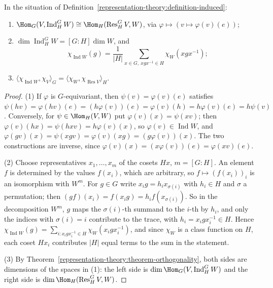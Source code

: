 \begin{proposition}\label{representation-theory:proposition-frobenius}
In the situation of Definition~\ref{representation-theory:definition-induced}:
\begin{enumerate}
\item $\Hom_G(V, \operatorname{Ind}_H^GW) \cong \Hom_H(\operatorname{Res}^G_HV, W)$, via $\varphi \mapsto (v \mapsto \varphi(v)(e))$;
\item $\dim\operatorname{Ind}_H^GW = [G : H]\dim W$, and
\[
\chi_{\operatorname{Ind}W}(g) = \frac{1}{|H|}\sum_{x \in G,\ xgx^{-1} \in H}\chi_W(xgx^{-1});
\]
\item $\langle\chi_{\operatorname{Ind}W}, \chi_V\rangle_G = \langle\chi_W, \chi_{\operatorname{Res}V}\rangle_H$.
\end{enumerate}
\end{proposition}

\begin{proof}
(1) If $\varphi$ is $G$-equivariant, then $\psi(v) = \varphi(v)(e)$ satisfies $\psi(hv) = \varphi(hv)(e) = (h\varphi(v))(e) = \varphi(v)(h) = h\varphi(v)(e) = h\psi(v)$. Conversely, for $\psi \in \Hom_H(V, W)$ put $\varphi(v)(x) = \psi(xv)$; then
$\varphi(v)(hx) = \psi(hxv) = h\varphi(v)(x)$, so $\varphi(v) \in \operatorname{Ind}W$, and $\varphi(gv)(x) = \psi(xgv) = \varphi(v)(xg) = (g\varphi(v))(x)$. The two constructions are inverse, since $\varphi(v)(x) = (x\varphi(v))(e) = \varphi(xv)(e)$.

(2) Choose representatives $x_1, \ldots, x_m$ of the cosets $Hx$, $m = [G : H]$. An element $f$ is determined by the values $f(x_i)$, which are arbitrary, so $f \mapsto (f(x_i))_i$ is an isomorphism with $W^m$. For $g \in G$ write
$x_ig = h_ix_{\sigma(i)}$ with $h_i \in H$ and $\sigma$ a permutation; then $(gf)(x_i) = f(x_ig) = h_if(x_{\sigma(i)})$. So in the decomposition $W^m$, $g$ maps the $\sigma(i)$-th summand to the $i$-th by $h_i$, and only the indices with
$\sigma(i) = i$ contribute to the trace, with $h_i = x_igx_i^{-1} \in H$. Hence $\chi_{\operatorname{Ind}W}(g) = \sum_{i : x_igx_i^{-1} \in H}\chi_W(x_igx_i^{-1})$, and since $\chi_W$ is a class function on $H$, each coset $Hx_i$ contributes $|H|$ equal terms to
the sum in the statement.

(3) By Theorem~\ref{representation-theory:theorem-orthogonality}, both sides are dimensions of the spaces in (1): the left side is $\dim\Hom_G(V, \operatorname{Ind}_H^GW)$ and the right side is $\dim\Hom_H(\operatorname{Res}^G_HV, W)$.
\end{proof}

